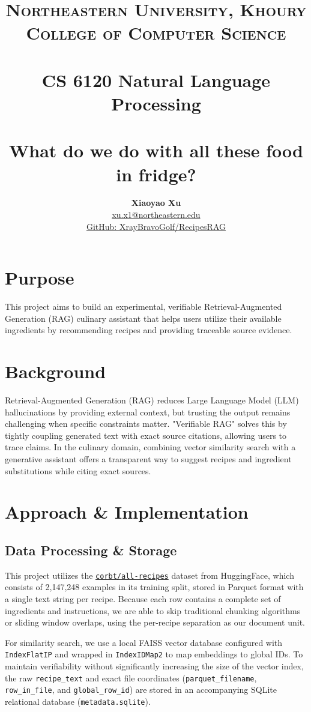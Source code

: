 \documentclass[paper=a4, fontsize=11pt]{scrartcl} %
\title{	
\normalfont \normalsize
\textsc{Northeastern University,  Khoury College of Computer Science} \\ [25pt]
\horrule{0.5pt} \\[0.4cm]
\huge CS 6120  Natural Language Processing \\ \assignment \\ [15pt]
\Large \textbf{What do we do with all these food in fridge?}
\horrule{2pt} \\[0.5cm]
}
\author{
    \textbf{Xiaoyao Xu} \\ 
    \href{mailto:xu.x1@northeastern.edu}{xu.x1@northeastern.edu} \\
    \href{https://github.com/XrayBravoGolf/RecipesRAG}{GitHub: XrayBravoGolf/RecipesRAG}
}%
\begin{document}
\maketitle %

\section{Purpose}
This project aims to build an experimental, verifiable Retrieval-Augmented Generation (RAG) culinary assistant that helps users utilize their available ingredients by recommending recipes and providing traceable source evidence.

\section{Background}
Retrieval-Augmented Generation (RAG) reduces Large Language Model (LLM) hallucinations by providing external context, but trusting the output remains challenging when specific constraints matter. "Verifiable RAG" solves this by tightly coupling generated text with exact source citations, allowing users to trace claims. In the culinary domain, combining vector similarity search with a generative assistant offers a transparent way to suggest recipes and ingredient substitutions while citing exact sources.

\section{Approach \& Implementation}

\subsection{Data Processing \& Storage}
This project utilizes the \href{https://huggingface.co/datasets/corbt/all-recipes}{\texttt{corbt/all-recipes}} dataset from HuggingFace, which consists of 2,147,248 examples in its training split, stored in Parquet format with a single text string per recipe. Because each row contains a complete set of ingredients and instructions, we are able to skip traditional chunking algorithms or sliding window overlaps, using the per-recipe separation as our document unit. 

For similarity search, we use a local FAISS vector database configured with \texttt{IndexFlatIP} and wrapped in \texttt{IndexIDMap2} to map embeddings to global IDs. To maintain verifiability without significantly increasing the size of the vector index, the raw \texttt{recipe\_text} and exact file coordinates (\texttt{parquet\_filename}, \texttt{row\_in\_file}, and \texttt{global\_row\_id}) are stored in an accompanying SQLite relational database (\texttt{metadata.sqlite}).
\end{document}
